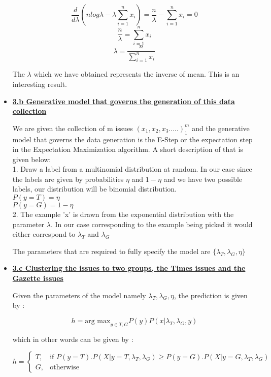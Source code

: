 \documentclass[11pt]{article}
\begin{document}
\begin{itemize}
	$$\frac{d}{d\lambda} \left( n log \lambda  - \lambda \sum_{i=1}^{n} x_i \right)= \frac{n}{\lambda} - \sum_{i=1}^{n}
	 x_i =0 $$
	 $$ \frac{n}{\lambda} = \sum_{i=1}^{n} x_i$$
	 $$\boxed{ \lambda= \frac{n}{\sum_{i=1}^{n} x_i} }$$
	 
	 The $\lambda$ which we have obtained represents the inverse of mean. This is an interesting result. 
	 
	 
	 \item[] \textbf{ \underline{3.b Generative model that governs the generation of this data collection}}
	 	
	 We are given the collection of m issues ${(x_1,x_2,x_3.....)}_{1}^{m}$ and the generative model that governs the data generation is the E-Step or the expectation step in the Expectation Maximization algorithm. A short description of that is given below:\\
	 
	 1. Draw a label from a multinomial distribution at random. In  our case since the labels are given by probabilities $\eta$ and $1-\eta$ and we have two possible labels, our distribution will be binomial distribution.\\
	 $P(y=T)= \eta$\\
	 $P(y=G)= 1- \eta$\\
	 
	 2. The example 'x' is drawn from the exponential distribution with the parameter $\lambda$. In our case corresponding to the example being picked it would either correspond to $\lambda_T$ and $\lambda_G$
	 
	 The parameters that are required to fully specify the model are $\{ \lambda_T, \lambda_G, \eta \}$
	  
	 \item[] \textbf{\underline{3.c  Clustering the issues to two groups, the Times issues and the Gazette issues}}
	 
	 Given the parameters of the model namely $\lambda_T, \lambda_G , \eta $, the prediction is given by :
	 
	 $$h =\text{arg max}_{y \in T, G} P(y) P(x | \lambda_T, \lambda_G, y) $$
	 
	 which in other words can be given by :
	 
	 $$ h = \begin{cases}
	 T,  & \text{if } P(y=T) . P(X| y=T, \lambda_T, \lambda_G  ) \geq P(y=G) . P(X| y=G, \lambda_T, \lambda_G )\\
	 G, & \text{otherwise}
	 \end{cases} $$
	 

\end{itemize}
\end{document}
